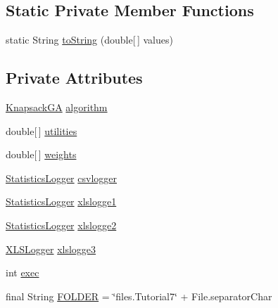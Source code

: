 \subsection*{Static Private Member Functions}
\begin{DoxyCompactItemize}
\item 
static String \hyperlink{classjenes_1_1tutorials_1_1old_1_1problem7_1_1_knapsack_logged_problem_a570440c68ea53298aa39eb32fac7b5bc}{to\-String} (double\mbox{[}$\,$\mbox{]} values)
\end{DoxyCompactItemize}
\subsection*{Private Attributes}
\begin{DoxyCompactItemize}
\item 
\hyperlink{classjenes_1_1tutorials_1_1old_1_1problem6_1_1_knapsack_g_a}{Knapsack\-G\-A} \hyperlink{classjenes_1_1tutorials_1_1old_1_1problem7_1_1_knapsack_logged_problem_a3719d5d73aa09301658fceaa02c1f8e8}{algorithm}
\item 
double\mbox{[}$\,$\mbox{]} \hyperlink{classjenes_1_1tutorials_1_1old_1_1problem7_1_1_knapsack_logged_problem_a79dbe5f2f7a1e89ee76c52ef2feadf7d}{utilities}
\item 
double\mbox{[}$\,$\mbox{]} \hyperlink{classjenes_1_1tutorials_1_1old_1_1problem7_1_1_knapsack_logged_problem_ac79326330cea056c35124d358cc2c928}{weights}
\item 
\hyperlink{classjenes_1_1statistics_1_1_statistics_logger}{Statistics\-Logger} \hyperlink{classjenes_1_1tutorials_1_1old_1_1problem7_1_1_knapsack_logged_problem_a9ac2d11d6fcbb1774849ed2fdb993569}{csvlogger}
\item 
\hyperlink{classjenes_1_1statistics_1_1_statistics_logger}{Statistics\-Logger} \hyperlink{classjenes_1_1tutorials_1_1old_1_1problem7_1_1_knapsack_logged_problem_ac6b79d6f74027f5fca098037bd77426e}{xlslogge1}
\item 
\hyperlink{classjenes_1_1statistics_1_1_statistics_logger}{Statistics\-Logger} \hyperlink{classjenes_1_1tutorials_1_1old_1_1problem7_1_1_knapsack_logged_problem_aab1f0b1495d6b60f2544c403fca3575e}{xlslogge2}
\item 
\hyperlink{classjenes_1_1utils_1_1_x_l_s_logger}{X\-L\-S\-Logger} \hyperlink{classjenes_1_1tutorials_1_1old_1_1problem7_1_1_knapsack_logged_problem_a6ee4f7b8ca8aab4c999674a9a6a052e5}{xlslogge3}
\item 
int \hyperlink{classjenes_1_1tutorials_1_1old_1_1problem7_1_1_knapsack_logged_problem_aa304d94fec15999b810f2cbc33cb90e8}{exec}
\item 
final String \hyperlink{classjenes_1_1tutorials_1_1old_1_1problem7_1_1_knapsack_logged_problem_a83b5c65f56323f2043f506bee3164c25}{F\-O\-L\-D\-E\-R} = \char`\"{}files.\-Tutorial7\char`\"{} + File.\-separator\-Char
\end{DoxyCompactItemize}
